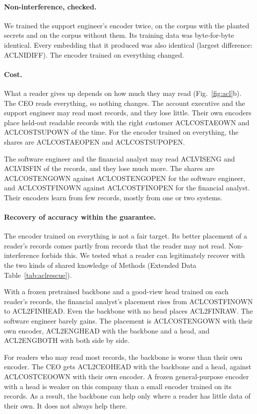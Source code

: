 \documentclass[11pt]{article}
\begin{document}
\paragraph{Non-interference, checked.} We trained the support engineer's encoder twice, on the corpus with the planted secrets and on the corpus without them. Its training data was byte-for-byte identical. Every embedding that it produced was also identical (largest difference: ACLNIDIFF). The encoder trained on everything changed.

\paragraph{Cost.} What a reader gives up depends on how much they may read (Fig.~\ref{fig:acl}b). The CEO reads everything, so nothing changes. The account executive and the support engineer may read most records, and they lose little. Their own encoders place held-out readable records with the right customer ACLCOSTAEOWN and ACLCOSTSUPOWN of the time. For the encoder trained on everything, the shares are ACLCOSTAEOPEN and ACLCOSTSUPOPEN.

The software engineer and the financial analyst may read ACLVISENG and ACLVISFIN of the records, and they lose much more. The shares are ACLCOSTENGOWN against ACLCOSTENGOPEN for the software engineer, and ACLCOSTFINOWN against ACLCOSTFINOPEN for the financial analyst. Their encoders learn from few records, mostly from one or two systems.

\paragraph{Recovery of accuracy within the guarantee.} The encoder trained on everything is not a fair target. Its better placement of a reader's records comes partly from records that the reader may not read. Non-interference forbids this. We tested what a reader can legitimately recover with the two kinds of shared knowledge of Methods (Extended Data Table~\ref{tab:aclrescue}).

With a frozen pretrained backbone and a good-view head trained on each reader's records, the financial analyst's placement rises from ACLCOSTFINOWN to ACL2FINHEAD. Even the backbone with no head places ACL2FINRAW. The software engineer barely gains. The placement is ACLCOSTENGOWN with their own encoder, ACL2ENGHEAD with the backbone and a head, and ACL2ENGBOTH with both side by side.

For readers who may read most records, the backbone is worse than their own encoder. The CEO gets ACL2CEOHEAD with the backbone and a head, against ACLCOSTCEOOWN with their own encoder. A frozen general-purpose encoder with a head is weaker on this company than a small encoder trained on its records. As a result, the backbone can help only where a reader has little data of their own. It does not always help there.
\end{document}

